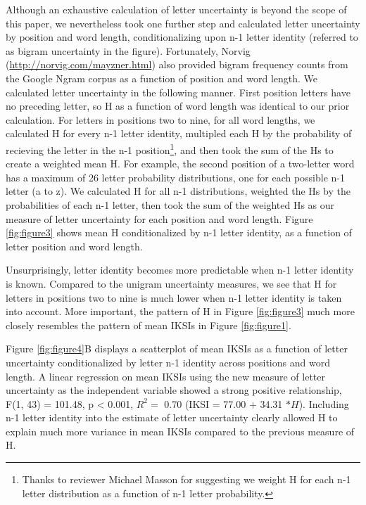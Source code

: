 \documentclass[,man,floatsintext]{apa6}
\let\rmarkdownfootnote\footnote%
\def\footnote{\protect\rmarkdownfootnote}
\begin{document}
Although an exhaustive calculation of letter uncertainty is beyond the scope of this paper, we nevertheless took one further step and calculated letter uncertainty by position and word length, conditionalizing upon n-1 letter identity (referred to as bigram uncertainty in the figure). Fortunately, Norvig (\url{http://norvig.com/mayzner.html}) also provided bigram frequency counts from the Google Ngram corpus as a function of position and word length. We calculated letter uncertainty in the following manner. First position letters have no preceding letter, so H as a function of word length was identical to our prior calculation. For letters in positions two to nine, for all word lengths, we calculated H for every n-1 letter identity, multipled each H by the probability of recieving the letter in the n-1 position\footnote{Thanks to reviewer Michael Masson for suggesting we weight H for each n-1 letter distribution as a function of n-1 letter probability.}, and then took the sum of the Hs to create a weighted mean H. For example, the second position of a two-letter word has a maximum of 26 letter probability distributions, one for each possible n-1 letter (a to z). We calculated H for all n-1 distributions, weighted the Hs by the probabilities of each n-1 letter, then took the sum of the weighted Hs as our measure of letter uncertainty for each position and word length. Figure \ref{fig:figure3} shows mean H conditionalized by n-1 letter identity, as a function of letter position and word length.

Unsurprisingly, letter identity becomes more predictable when n-1 letter identity is known. Compared to the unigram uncertainty measures, we see that H for letters in positions two to nine is much lower when n-1 letter identity is taken into account. More important, the pattern of H in Figure \ref{fig:figure3} much more closely resembles the pattern of mean IKSIs in Figure \ref{fig:figure1}.

Figure \ref{fig:figure4}B displays a scatterplot of mean IKSIs as a function of letter uncertainty conditionalized by letter n-1 identity across positions and word length. A linear regression on mean IKSIs using the new measure of letter uncertainty as the independent variable showed a strong positive relationship, F(1, 43) = 101.48, p \textless{} 0.001, \(R^2 =\) 0.70 (IKSI = 77.00 \(+\) 34.31 \(*H\)). Including n-1 letter identity into the estimate of letter uncertainty clearly allowed H to explain much more variance in mean IKSIs compared to the previous measure of H.
\end{document}
